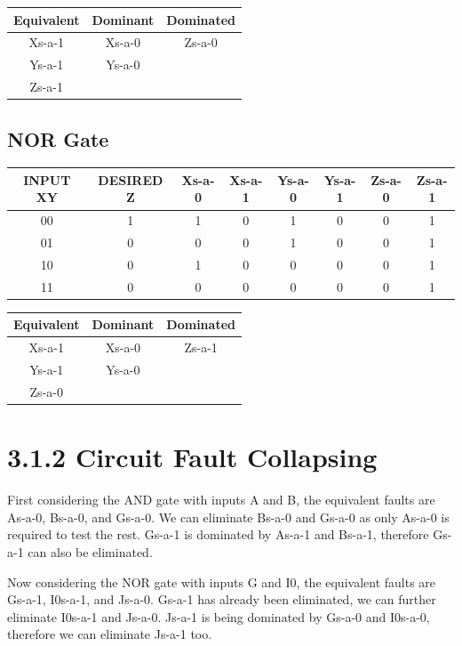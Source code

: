 \documentclass[11pt]{report}
\begin{document}
\begin{tabular}{ |c|c|c| }
\hline
Equivalent & Dominant & Dominated
\\ 
\hline
\hline
Xs-a-1 & Xs-a-0 & Zs-a-0
\\  
\hline
Ys-a-1 & Ys-a-0 & 
\\
\hline
Zs-a-1 & & 
\\
\hline
\end{tabular}



\subsection*{NOR Gate}
\begin{tabular}{ |c|c|c|c|c|c|c|c| }
\hline
INPUT XY & DESIRED Z & Xs-a-0 & Xs-a-1 & Ys-a-0 & Ys-a-1 & Zs-a-0 & Zs-a-1
\\ 
\hline
\hline
00 & 1 & 1 & \cellcolor{yellow!50}0 & 1 & \cellcolor{yellow!50}0 & \cellcolor{yellow!50}0 & 1
\\  
\hline
01 & 0 & 0 & 0 & \cellcolor{yellow!50}1 & 0 & 0 & \cellcolor{yellow!50}1
\\
\hline
10 & 0 & \cellcolor{yellow!50}1 & 0 & 0 & 0 & 0 & \cellcolor{yellow!50}1
\\
\hline
11 & 0 & 0 & 0 & 0 & 0 & 0 & \cellcolor{yellow!50}1
\\
\hline
\end{tabular}

\begin{tabular}{ |c|c|c| }
\hline
Equivalent & Dominant & Dominated
\\ 
\hline
\hline
Xs-a-1 & Xs-a-0 & Zs-a-1
\\  
\hline
Ys-a-1 & Ys-a-0 & 
\\
\hline
Zs-a-0 & & 
\\
\hline
\end{tabular}



\section*{3.1.2 Circuit Fault Collapsing}
First considering the AND gate with inputs A and B, the equivalent faults
are As-a-0, Bs-a-0, and Gs-a-0. We can eliminate Bs-a-0 and Gs-a-0 as
only As-a-0 is required to test the rest. Gs-a-1 is dominated by As-a-1
and Bs-a-1, therefore Gs-a-1 can also be eliminated.

Now considering the NOR gate with inputs G and I0, the equivalent faults
are Gs-a-1, I0s-a-1, and Js-a-0. Gs-a-1 has already been eliminated, we can
further eliminate I0s-a-1 and Js-a-0. Js-a-1 is being dominated by Gs-a-0 and
I0s-a-0, therefore we can eliminate Js-a-1 too.
\end{document}
